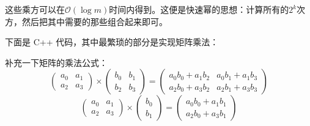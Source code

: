 \documentclass[UTF8,12pt]{ctexart}
\begin{document}
这些乘方可以在$\mathcal{O}(\log m)$时间内得到。这便是快速幂的思想：计算所有的$2^k$次方，然后把其中需要的那些组合起来即可。

下面是 C++ 代码，其中最繁琐的部分是实现矩阵乘法：

\begin{mdframed}[backgroundcolor=bkgblack]

\end{mdframed}

\begin{mdframed}[backgroundcolor=bkgblack]

\end{mdframed}

补充一下矩阵的乘法公式：
\[\begin{pmatrix}a_0&a_1\\a_2&a_3\end{pmatrix}\times\begin{pmatrix}b_0&b_1\\b_2&b_3\end{pmatrix}=\begin{pmatrix}a_0b_0+a_1b_2&a_0b_1+a_1b_3\\a_2b_0+a_3b_2&a_2b_1+a_3b_3\end{pmatrix}\]
\[\begin{pmatrix}a_0&a_1\\a_2&a_3\end{pmatrix}\times\begin{pmatrix}b_0\\b_1\end{pmatrix}=\begin{pmatrix}a_0b_0+a_1b_1\\a_2b_0+a_3b_1\end{pmatrix}\]
\end{document}
